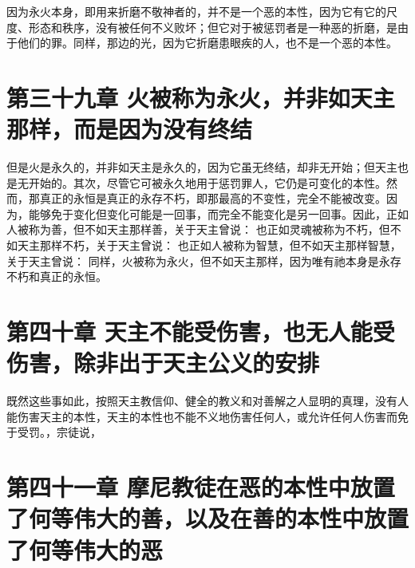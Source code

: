 因为永火本身，即用来折磨不敬神者的，并不是一个恶的本性，因为它有它的尺度、形态和秩序，没有被任何不义败坏；但它对于被惩罚者是一种恶的折磨，是由于他们的罪。同样，那边的光，因为它折磨患眼疾的人，也不是一个恶的本性。\par


\section{第三十九章 火被称为永火，并非如天主那样，而是因为没有终结}

但是火是永久的，并非如天主是永久的，因为它虽无终结，却非无开始；但天主也是无开始的。其次，尽管它可被永久地用于惩罚罪人，它仍是可变化的本性。然而，那真正的永恒是真正的永存不朽，即那最高的不变性，完全不能被改变。因为，能够免于变化但变化可能是一回事，而完全不能变化是另一回事。因此，正如人被称为善，但不如天主那样善，关于天主曾说： 也正如灵魂被称为不朽，但不如天主那样不朽，关于天主曾说： 也正如人被称为智慧，但不如天主那样智慧，关于天主曾说： 同样，火被称为永火，但不如天主那样，因为唯有祂本身是永存不朽和真正的永恒。\par


\section{第四十章 天主不能受伤害，也无人能受伤害，除非出于天主公义的安排}

既然这些事如此，按照天主教信仰、健全的教义和对善解之人显明的真理，没有人能伤害天主的本性，天主的本性也不能不义地伤害任何人，或允许任何人伤害而免于受罚。，宗徒说，\par


\section{第四十一章 摩尼教徒在恶的本性中放置了何等伟大的善，以及在善的本性中放置了何等伟大的恶}

